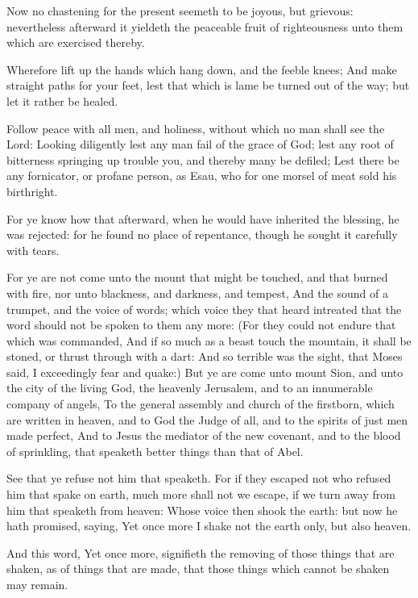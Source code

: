 \Verse Now no chastening for the present seemeth to be joyous, but grievous: nevertheless afterward it yieldeth the peaceable fruit of righteousness unto them which are exercised thereby.

\Verse Wherefore lift up the hands which hang down, and the feeble knees; \Verse And make straight paths for your feet, lest that which is lame be turned out of the way; but let it rather be healed.

\Verse Follow peace with all men, and holiness, without which no man shall see the Lord: \Verse Looking diligently lest any man fail of the grace of God; lest any root of bitterness springing up trouble you, and thereby many be defiled; \Verse Lest there be any fornicator, or profane person, as Esau, who for one morsel of meat sold his birthright.

\Verse For ye know how that afterward, when he would have inherited the blessing, he was rejected: for he found no place of repentance, though he sought it carefully with tears.

\Verse For ye are not come unto the mount that might be touched, and that burned with fire, nor unto blackness, and darkness, and tempest, \Verse And the sound of a trumpet, and the voice of words; which voice they that heard intreated that the word should not be spoken to them any more: \Verse (For they could not endure that which was commanded, And if so much as a beast touch the mountain, it shall be stoned, or thrust through with a dart: \Verse And so terrible was the sight, that Moses said, I exceedingly fear and quake:) \Verse But ye are come unto mount Sion, and unto the city of the living God, the heavenly Jerusalem, and to an innumerable company of angels, \Verse To the general assembly and church of the firstborn, which are written in heaven, and to God the Judge of all, and to the spirits of just men made perfect, \Verse And to Jesus the mediator of the new covenant, and to the blood of sprinkling, that speaketh better things than that of Abel.

\Verse See that ye refuse not him that speaketh. For if they escaped not who refused him that spake on earth, much more shall not we escape, if we turn away from him that speaketh from heaven: \Verse Whose voice then shook the earth: but now he hath promised, saying, Yet once more I shake not the earth only, but also heaven.

\Verse And this word, Yet once more, signifieth the removing of those things that are shaken, as of things that are made, that those things which cannot be shaken may remain.

